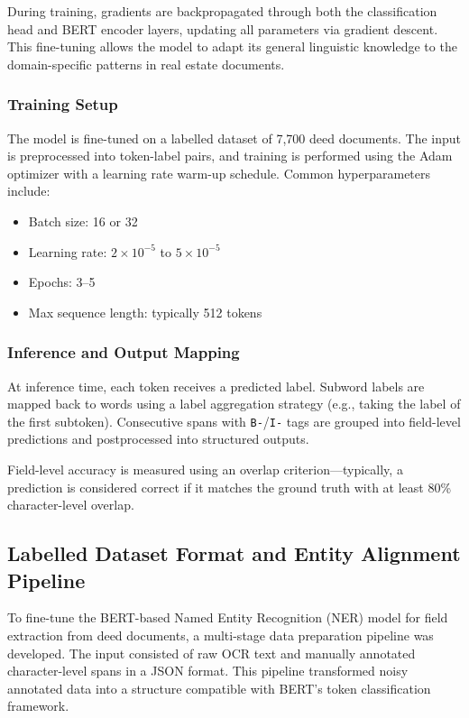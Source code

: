 \documentclass{article}
\begin{document}
During training, gradients are backpropagated through both the classification head and BERT encoder layers, updating all parameters via gradient descent. This fine-tuning allows the model to adapt its general linguistic knowledge to the domain-specific patterns in real estate documents.

\subsubsection{Training Setup}

The model is fine-tuned on a labelled dataset of 7,700 deed documents. The input is preprocessed into token-label pairs, and training is performed using the Adam optimizer with a learning rate warm-up schedule. Common hyperparameters include:
\begin{itemize}
    \item Batch size: 16 or 32
    \item Learning rate: $2 \times 10^{-5}$ to $5 \times 10^{-5}$
    \item Epochs: 3–5
    \item Max sequence length: typically 512 tokens
\end{itemize}

\subsubsection{Inference and Output Mapping}

At inference time, each token receives a predicted label. Subword labels are mapped back to words using a label aggregation strategy (e.g., taking the label of the first subtoken). Consecutive spans with \texttt{B-}/\texttt{I-} tags are grouped into field-level predictions and postprocessed into structured outputs.

Field-level accuracy is measured using an overlap criterion—typically, a prediction is considered correct if it matches the ground truth with at least 80\% character-level overlap.

\subsection{Labelled Dataset Format and Entity Alignment Pipeline}

To fine-tune the BERT-based Named Entity Recognition (NER) model for field extraction from deed documents, a multi-stage data preparation pipeline was developed. The input consisted of raw OCR text and manually annotated character-level spans in a JSON format. This pipeline transformed noisy annotated data into a structure compatible with BERT's token classification framework.
\end{document}
